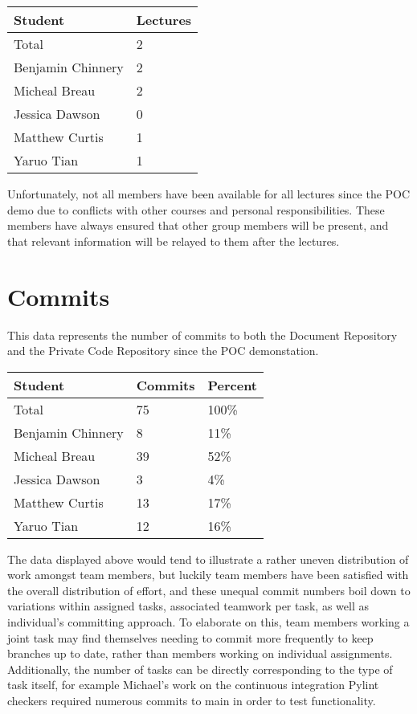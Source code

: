 \documentclass{article}
\begin{document}
\begin{table}[H]
\centering
\begin{tabular}{ll}
\toprule
\textbf{Student} & \textbf{Lectures}\\
\midrule
Total & 2\\
Benjamin Chinnery & 2\\
Micheal Breau & 2\\
Jessica Dawson & 0\\
Matthew Curtis & 1\\
Yaruo Tian & 1\\
\bottomrule
\end{tabular}
\end{table}

Unfortunately, not all members have been available for all lectures since the POC demo due to conflicts with other courses and personal responsibilities. These members have always ensured that other group members will be present, and that relevant information will be relayed to them after the lectures.

\section{Commits}

This data represents the number of commits to both the Document Repository and the Private Code Repository since the POC demonstation. 
\begin{table}[H]
\centering
\begin{tabular}{lll}
\toprule
\textbf{Student} & \textbf{Commits} & \textbf{Percent}\\
\midrule
Total & 75 & 100\% \\
Benjamin Chinnery & 8 & 11\%\\
Micheal Breau & 39 & 52\%\\
Jessica Dawson & 3 & 4\%\\
Matthew Curtis & 13 & 17\%\\
Yaruo Tian & 12 & 16\%\\
\bottomrule
\end{tabular}
\end{table}

The data displayed above would tend to illustrate a rather uneven distribution of work amongst team members, but luckily team members have been satisfied with the overall distribution of effort, and these unequal commit numbers boil down to variations within assigned tasks, associated teamwork per task, as well as individual's committing approach. To elaborate on this, team members working a joint task may find themselves needing to commit more frequently to keep branches up to date, rather than members working on individual assignments. Additionally, the number of tasks can be directly corresponding to the type of task itself, for example Michael's work on the continuous integration Pylint checkers required numerous commits to main in order to test functionality.
\end{document}
